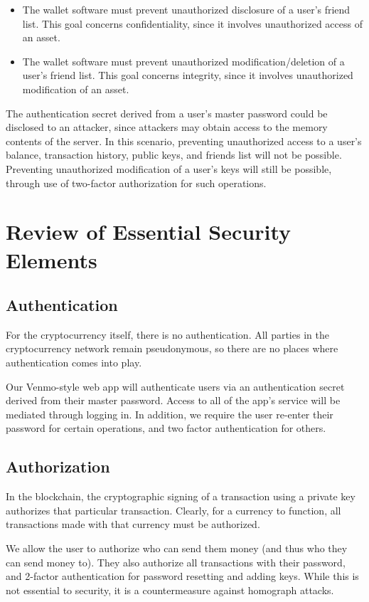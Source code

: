 \documentclass[12pt]{article}
\begin{document}
\begin{itemize}
\item The wallet software must prevent unauthorized disclosure of a user's friend list. This goal concerns confidentiality, since it involves unauthorized access of an asset.
\item The wallet software must prevent unauthorized modification/deletion of a user's friend list. This goal concerns integrity, since it involves unauthorized modification of an asset.
\end{itemize}

The authentication secret derived from a user's master password could be disclosed to an attacker, since attackers may obtain access to the memory contents of the server.
In this scenario, preventing unauthorized access to a user's balance, transaction history, public keys, and friends list will not be possible.
Preventing unauthorized modification of a user's keys will still be possible, through use of two-factor authorization for such operations.

\section{Review of Essential Security Elements}

\subsection{Authentication}

For the cryptocurrency itself, there is no authentication. All parties in the cryptocurrency network remain pseudonymous, so there are no places where authentication comes into play.

Our Venmo-style web app will authenticate users via an authentication secret derived from their master password. Access to all of the app's service will be mediated through logging in. In addition, we require the user re-enter their password for certain operations, and two factor authentication for others.

\subsection{Authorization}

In the blockchain, the cryptographic signing of a transaction using a private key authorizes that particular transaction. Clearly, for a currency to function, all transactions made with that currency must be authorized.

We allow the user to authorize who can send them money (and thus who they can send money to). They also authorize all transactions with their password, and 2-factor authentication for password resetting and adding keys.
While this is not essential to security, it is a countermeasure against homograph attacks.
\end{document}
